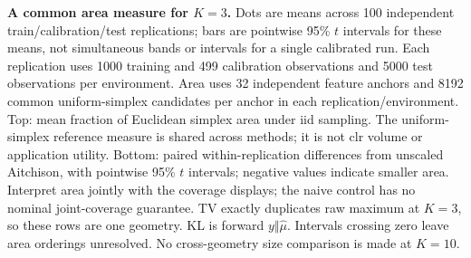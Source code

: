 \textbf{A common area measure for $K=3$.} Dots are means across 100 independent train/calibration/test replications; bars are pointwise 95\% $t$ intervals for these means, not simultaneous bands or intervals for a single calibrated run. Each replication uses 1000 training and 499 calibration observations and 5000 test observations per environment. Area uses 32 independent feature anchors and 8192 common uniform-simplex candidates per anchor in each replication/environment. Top: mean fraction of Euclidean simplex area under iid sampling. The uniform-simplex reference measure is shared across methods; it is not clr volume or application utility. Bottom: paired within-replication differences from unscaled Aitchison, with pointwise 95\% $t$ intervals; negative values indicate smaller area. Interpret area jointly with the coverage displays; the naive control has no nominal joint-coverage guarantee. TV exactly duplicates raw maximum at $K=3$, so these rows are one geometry. KL is forward $y\Vert\hat\mu$. Intervals crossing zero leave area orderings unresolved. No cross-geometry size comparison is made at $K=10$.
